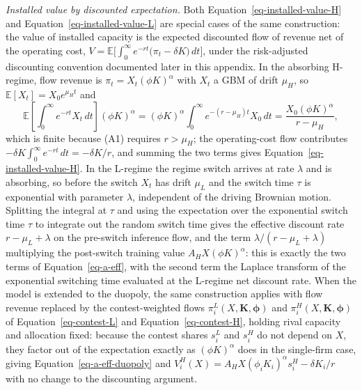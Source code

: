 \documentclass[
  11pt,
  letterpaper,
]{scrartcl}
\begin{document}
\emph{Installed value by discounted expectation.} Both
Equation~\ref{eq-installed-value-H} and
Equation~\ref{eq-installed-value-L} are special cases of the same
construction: the value of installed capacity is the expected discounted
flow of revenue net of the operating cost,
\(V = \mathbb{E}\bigl[\int_0^\infty e^{-rt} \bigl(\pi_t - \delta K\bigr)\, dt\bigr]\),
under the risk-adjusted discounting convention documented later in this
appendix. In the absorbing H-regime, flow revenue is
\(\pi_t = X_t (\phi K)^\alpha\) with \(X_t\) a GBM of drift \(\mu_H\),
so \(\mathbb{E}[X_t] = X_0 e^{\mu_H t}\) and \[
\mathbb{E}\left[\int_0^\infty e^{-rt} X_t\, dt\right] (\phi K)^\alpha = (\phi K)^\alpha \int_0^\infty e^{-(r-\mu_H)t} X_0\, dt = \frac{X_0 (\phi K)^\alpha}{r - \mu_H},
\] which is finite because (A1) requires \(r > \mu_H\); the
operating-cost flow contributes
\(-\delta K \int_0^\infty e^{-rt}\, dt = -\delta K/r\), and summing the
two terms gives Equation~\ref{eq-installed-value-H}. In the L-regime the
regime switch arrives at rate \(\lambda\) and is absorbing, so before
the switch \(X_t\) has drift \(\mu_L\) and the switch time \(\tau\) is
exponential with parameter \(\lambda\), independent of the driving
Brownian motion. Splitting the integral at \(\tau\) and using the
expectation over the exponential switch time \(\tau\) to integrate out
the random switch time gives the effective discount rate
\(r - \mu_L + \lambda\) on the pre-switch inference flow, and the term
\(\lambda/(r - \mu_L + \lambda)\) multiplying the post-switch training
value \(A_H X (\phi K)^\alpha\): this is exactly the two terms of
Equation~\ref{eq-a-eff}, with the second term the Laplace transform of
the exponential switching time evaluated at the L-regime net discount
rate. When the model is extended to the duopoly, the same construction
applies with flow revenue replaced by the contest-weighted flows
\(\pi_i^L(X, \mathbf{K}, \boldsymbol\phi)\) and
\(\pi_i^H(X, \mathbf{K}, \boldsymbol\phi)\) of
Equation~\ref{eq-contest-L} and Equation~\ref{eq-contest-H}, holding
rival capacity and allocation fixed: because the contest shares
\(s_i^L\) and \(s_i^H\) do not depend on \(X\), they factor out of the
expectation exactly as \((\phi K)^\alpha\) does in the single-firm case,
giving Equation~\ref{eq-a-eff-duopoly} and
\(V_i^H(X) = A_H X (\phi_i K_i)^\alpha s_i^H - \delta K_i/r\) with no
change to the discounting argument.
\end{document}
